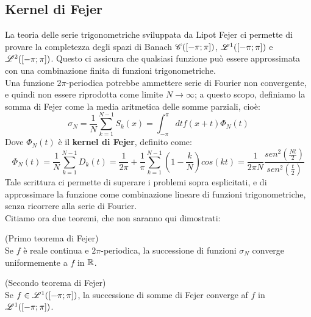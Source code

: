 \subsection{Kernel di Fejer}
La teoria delle serie trigonometriche sviluppata da Lipot Fejer ci permette di provare la completezza degli spazi di Banach $\mathscr{C}([- \pi ; \pi])$, $\mathscr{L}^1([- \pi ; \pi])$ e $\mathscr{L}^2 ([- \pi ; \pi])$. Questo ci assicura che qualsiasi funzione può essere approssimata con una combinazione finita di funzioni trigonometriche. \\
Una funzione $2 \pi$-periodica potrebbe ammettere serie di Fourier non convergente, e quindi non essere riprodotta come limite $N \to \infty$; a questo scopo, definiamo la somma di Fejer come la media aritmetica delle somme parziali, cioè:
$$\sigma _N= \frac{1}{N} \sum_{k=1} ^{N-1} S_k (x)= \int_{-\pi} ^{\pi} dt f(x+t) \Phi _N(t)$$
Dove $\Phi _N(t)$ è il \textbf{kernel di Fejer}, definito come:
$$\Phi _N(t)= \frac{1}{N} \sum_{k=1} ^{N-1} D_k (t)= \frac{1}{2 \pi} + \frac{1}{\pi} \sum_{k=1} ^{N-1} \left(1- \frac{k}{N} \right) cos(kt)= \frac{1}{2 \pi N} \frac{sen^2\left(\frac{Nt}{2}\right)}{sen^2\left(\frac{t}{2}\right)}$$
Tale scrittura ci permette di superare i problemi sopra esplicitati, e di approssimare la funzione come combinazione lineare di funzioni trigonometriche, senza ricorrere alla serie di Fourier.\\
Citiamo ora due teoremi, che non saranno qui dimostrati:
\begin{teorema}(Primo teorema di Fejer)\\
Se $f$ è reale continua e $2 \pi$-periodica, la successione di funzioni $\sigma _N$ converge uniformemente a $f$ in $\mathbb{R}$.
\end{teorema}
\begin{teorema}(Secondo teorema di Fejer)\\
Se $f \in \mathscr{L}^1([-\pi;\pi])$, la successione di somme di Fejer converge af $f$ in $\mathscr{L}^1([-\pi;\pi])$.
\end{teorema}
